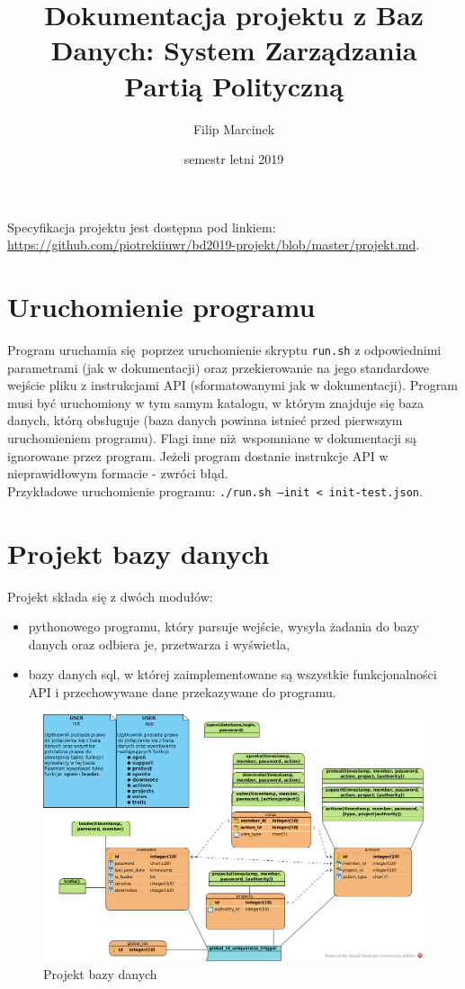 \documentclass[a4paper,10pt]{article}
\title{Dokumentacja projektu z Baz Danych: System Zarządzania Partią Polityczną}
\author{Filip Marcinek}
\date{semestr letni 2019}
\begin{document}
\maketitle

Specyfikacja projektu jest dostępna pod linkiem: \href{https://github.com/piotrekiiuwr/bd2019-projekt/blob/master/projekt.md}{https://github.com/piotrekiiuwr/bd2019-projekt/blob/master/projekt.md}.

\section{Uruchomienie programu}
Program uruchamia się poprzez uruchomienie skryptu \texttt{run.sh} z odpowiednimi parametrami (jak w dokumentacji) oraz przekierowanie na jego standardowe wejście pliku z instrukcjami API (sformatowanymi jak w dokumentacji).
Program musi być uruchomiony w tym samym katalogu, w którym znajduje się baza danych, którą obsługuje (baza danych powinna istnieć przed pierwszym uruchomieniem programu).
Flagi inne niż wspomniane w dokumentacji są ignorowane przez program. Jeżeli program dostanie instrukcje API w nieprawidłowym formacie - zwróci błąd. \\
Przykładowe uruchomienie programu: \texttt{./run.sh --init < init-test.json}.

\section{Projekt bazy danych}
Projekt składa się z dwóch modułów:
\begin{itemize}
 \item pythonowego programu, który parsuje wejście, wysyła żadania do bazy danych oraz odbiera je, przetwarza i wyświetla,
 \item bazy danych sql, w której zaimplementowane są wszystkie funkcjonalności API i przechowywane dane przekazywane do programu.
\end{itemize}

\begin{figure}
  \includegraphics[width=\linewidth]{Projekt_bazy_danych_2019_Filip_Marcinek.png}
  \caption{Projekt bazy danych}
  \label{fig:project}
\end{figure}
\end{document}
